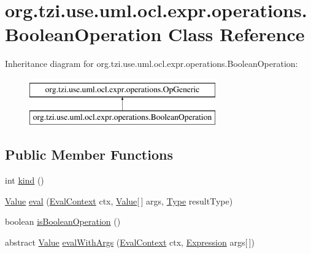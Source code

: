 \hypertarget{classorg_1_1tzi_1_1use_1_1uml_1_1ocl_1_1expr_1_1operations_1_1_boolean_operation}{\section{org.\-tzi.\-use.\-uml.\-ocl.\-expr.\-operations.\-Boolean\-Operation Class Reference}
\label{classorg_1_1tzi_1_1use_1_1uml_1_1ocl_1_1expr_1_1operations_1_1_boolean_operation}
}
Inheritance diagram for org.\-tzi.\-use.\-uml.\-ocl.\-expr.\-operations.\-Boolean\-Operation\-:\begin{figure}[H]
\begin{center}
\leavevmode
\includegraphics[height=2.000000cm]{classorg_1_1tzi_1_1use_1_1uml_1_1ocl_1_1expr_1_1operations_1_1_boolean_operation}
\end{center}
\end{figure}
\subsection*{Public Member Functions}
\begin{DoxyCompactItemize}
\item 
int \hyperlink{classorg_1_1tzi_1_1use_1_1uml_1_1ocl_1_1expr_1_1operations_1_1_boolean_operation_acca9bfb64a3251e9b82b05b3c72457b5}{kind} ()
\item 
\hyperlink{classorg_1_1tzi_1_1use_1_1uml_1_1ocl_1_1value_1_1_value}{Value} \hyperlink{classorg_1_1tzi_1_1use_1_1uml_1_1ocl_1_1expr_1_1operations_1_1_boolean_operation_ad3921bd25a8f2efe16edbf291083e9c9}{eval} (\hyperlink{classorg_1_1tzi_1_1use_1_1uml_1_1ocl_1_1expr_1_1_eval_context}{Eval\-Context} ctx, \hyperlink{classorg_1_1tzi_1_1use_1_1uml_1_1ocl_1_1value_1_1_value}{Value}\mbox{[}$\,$\mbox{]} args, \hyperlink{interfaceorg_1_1tzi_1_1use_1_1uml_1_1ocl_1_1type_1_1_type}{Type} result\-Type)
\item 
boolean \hyperlink{classorg_1_1tzi_1_1use_1_1uml_1_1ocl_1_1expr_1_1operations_1_1_boolean_operation_ada8596ff416fcdbbff569a55ff89c947}{is\-Boolean\-Operation} ()
\item 
abstract \hyperlink{classorg_1_1tzi_1_1use_1_1uml_1_1ocl_1_1value_1_1_value}{Value} \hyperlink{classorg_1_1tzi_1_1use_1_1uml_1_1ocl_1_1expr_1_1operations_1_1_boolean_operation_ada4d0a04cb69a7f1367b80f7fbf0256c}{eval\-With\-Args} (\hyperlink{classorg_1_1tzi_1_1use_1_1uml_1_1ocl_1_1expr_1_1_eval_context}{Eval\-Context} ctx, \hyperlink{classorg_1_1tzi_1_1use_1_1uml_1_1ocl_1_1expr_1_1_expression}{Expression} args\mbox{[}$\,$\mbox{]})
\end{DoxyCompactItemize}
